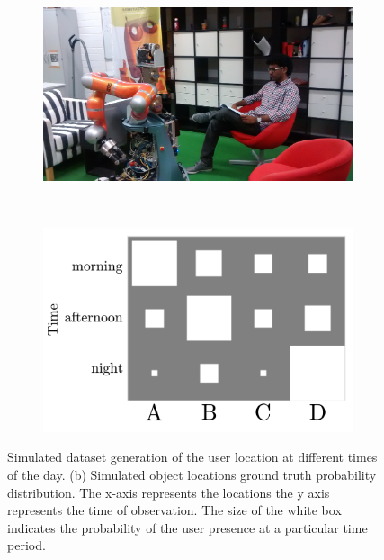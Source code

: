 \begin{figure}
    \centering
    \begin{subfigure}[b]{0.4\textwidth}
        \includegraphics[width=\textwidth]{images/cleaning_1.jpg}
        \caption{}
        \label{fig:eval_human}
    \end{subfigure}
    ~ %
    \begin{subfigure}[b]{0.4\textwidth}
        \includegraphics[width=\textwidth]{images/abc.png}
        \caption{}
        \label{fig:eval_user_gt}
    \end{subfigure}
    \caption[Model validation dataset generation]{Simulated dataset generation of the user location at different times of the day. (b) Simulated object locations ground truth probability distribution.
The x-axis represents the locations the y axis represents the time of observation. The size of the white box indicates the probability of the user presence at a particular time period.}
\label{}
\end{figure}




